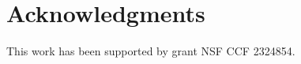 \section*{Acknowledgments}\label{sec:acknowledgements}
This work has been supported by grant NSF CCF 2324854.